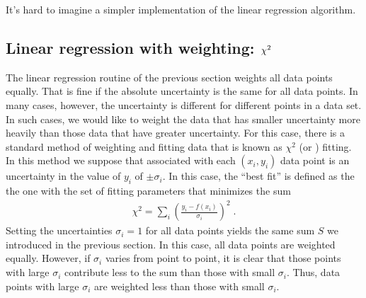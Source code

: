 \documentclass[letterpaper,10pt,english]{sphinxmanual}
\begin{document}
\sphinxAtStartPar
It’s hard to imagine a simpler implementation of the linear regression algorithm.

\ignorespaces 

\subsection{Linear regression with weighting: \protect\(\chi^2\protect\)}
\label{\detokenize{chap7/chap7_funcs:linear-regression-with-weighting-chi-2}}\label{\detokenize{chap7/chap7_funcs:index-6}}
\sphinxAtStartPar
The linear regression routine of the previous section weights all data points equally.  That is fine if the absolute uncertainty is the same for all data points.  In many cases, however, the uncertainty is different for different points in a data set.  In such cases, we would like to weight the data that has smaller uncertainty more heavily than those data that have greater uncertainty.  For this case, there is a standard method of weighting and fitting data that is known as \(\chi^2\)  (or ) fitting.  In this method we suppose that associated with each \((x_{i},y_{i})\) data point is an uncertainty in the value of \(y_{i}\) of \(\pm\sigma_{i}\).  In this case, the “best fit” is defined as the the one with the set of fitting parameters that minimizes the sum
\begin{equation}\label{equation:chap7/chap7_funcs:eq:chisq}
\begin{split}\chi^2 = \sum_{i} \left(\frac{y_{i} - f(x_{i})} {\sigma_{i}}\right)^2 \;.\end{split}
\end{equation}
\sphinxAtStartPar
Setting the uncertainties \(\sigma_{i}=1\) for all data points yields the same sum \(S\) we introduced in the previous section.  In this case, all data points are weighted equally.  However, if \(\sigma_{i}\) varies from point to point, it is clear that those points with large \(\sigma_{i}\) contribute less to the sum than those with small \(\sigma_{i}\).  Thus, data points with large \(\sigma_{i}\) are weighted less than those with small \(\sigma_{i}\).
\end{document}
